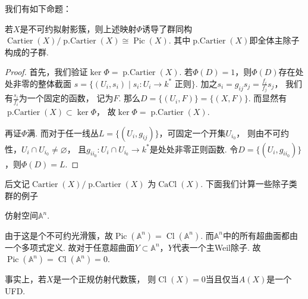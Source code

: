     我们有如下命题：
    \begin{theorem}
        若$X$是不可约拟射影簇，则上述映射$\Phi$诱导了群同构
        $\operatorname{Cartier}(X)/\operatorname{p.Cartier}(X) \cong \operatorname{Pic}(X)$.
        其中$\operatorname{p.Cartier}(X)$即全体主除子构成的子群.
    \end{theorem}
    \begin{proof}
        首先，我们验证$\ker \Phi = \operatorname{p.Cartier}(X)$.
        若$\Phi(D)=1$，则$\Phi(D)$存在处处非零的整体截面
        $s=\{(U_{i},s_{i})\mid s_{i}\colon U_{i} \rightarrow k^{*}\text{ 正则}\}$.
        加之$s_{i}=g_{ij}s_{j}=\frac{f_{i}}{f_{j}}s_{j}$，
        我们有$\frac{s_{i}}{f_{i}}$为一个固定的函数，
        记为$F$. 那么$D=\{(U_{i},F)\}=\{(X,F)\}$. 
        而显然有$\operatorname{p.Cartier}(X) \subset \ker \Phi$，
        故$\ker \Phi = \operatorname{p.Cartier}(X)$. \par
        再证$\Phi$满. 而对于任一线丛$L=\{(U_{i},g_{ij})\}$，可固定一个开集$U_{i_{0}}$，
        则由不可约性，$U_{i} \cap U_{i_{0}} \neq \varnothing$，
        且$g_{ii_{0}}\colon U_{i} \cap U_{i_{0}} \rightarrow k^{*}$是处处非零正则函数.
        令$D=\{(U_{i},g_{ii_{0}})\}$，则$\Phi(D)=L$.
    \end{proof}

    后文记$\operatorname{Cartier}(X)/\operatorname{p.Cartier}(X)$
    为$\operatorname{CaCl}(X)$. 下面我们计算一些除子类群的例子
    
    \begin{example}
        仿射空间$\mathbb{A}^{n}$. \par
        由于这是个不可约光滑簇，故$\operatorname{Pic}(\mathbb{A}^{n})=\operatorname{Cl}(\mathbb{A}^{n})$.
        而$\mathbb{A}^{n}$中的所有超曲面都由一个多项式定义. 
        故对于任意超曲面$Y \subset \mathbb{A}^{n}$，$Y$代表一个主Weil除子.
        故$\operatorname{Pic}(\mathbb{A}^{n})=\operatorname{Cl}(\mathbb{A}^{n})=0$.

        事实上，若$X$是一个正规仿射代数簇，
        则$\operatorname{Cl}(X)=0$当且仅当$A(X)$是一个UFD.
    \end{example}

